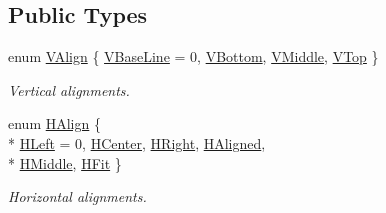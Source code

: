 \subsection*{Public Types}
\begin{DoxyCompactItemize}
\item 
enum \hyperlink{class_d_r_w___text_a369c571137713ac08c5a5a9b66ff6c27}{V\+Align} \{ \hyperlink{class_d_r_w___text_a369c571137713ac08c5a5a9b66ff6c27a26e0d96529d0c6edf8fe94c09ffd1661}{V\+Base\+Line} = 0, 
\hyperlink{class_d_r_w___text_a369c571137713ac08c5a5a9b66ff6c27a64c2355b0923f0634c45002f571c9fba}{V\+Bottom}, 
\hyperlink{class_d_r_w___text_a369c571137713ac08c5a5a9b66ff6c27adf2dfb4d3e854d4c660246808495152e}{V\+Middle}, 
\hyperlink{class_d_r_w___text_a369c571137713ac08c5a5a9b66ff6c27ad6c53af0a564a39018d403af25aa97e3}{V\+Top}
 \}
\begin{DoxyCompactList}\small\item\em Vertical alignments. \end{DoxyCompactList}\item 
enum \hyperlink{class_d_r_w___text_a66511da21199b0ab967fa951bc339f2d}{H\+Align} \{ \\*
\hyperlink{class_d_r_w___text_a66511da21199b0ab967fa951bc339f2da2fca970851f2bddb3f018307e47f653c}{H\+Left} = 0, 
\hyperlink{class_d_r_w___text_a66511da21199b0ab967fa951bc339f2dacae7fa84a0beaf06577027631f445225}{H\+Center}, 
\hyperlink{class_d_r_w___text_a66511da21199b0ab967fa951bc339f2dafc3e7b70ef3f4cb5bf2228f0fe2dfc8f}{H\+Right}, 
\hyperlink{class_d_r_w___text_a66511da21199b0ab967fa951bc339f2da3f5e5f69673e0b948de41c8e16ffd131}{H\+Aligned}, 
\\*
\hyperlink{class_d_r_w___text_a66511da21199b0ab967fa951bc339f2da9705528a85e9416e32dbb959ad22a584}{H\+Middle}, 
\hyperlink{class_d_r_w___text_a66511da21199b0ab967fa951bc339f2da3b8fe44dc62bffe5c97d7b96ef1b3c23}{H\+Fit}
 \}
\begin{DoxyCompactList}\small\item\em Horizontal alignments. \end{DoxyCompactList}\end{DoxyCompactItemize}
